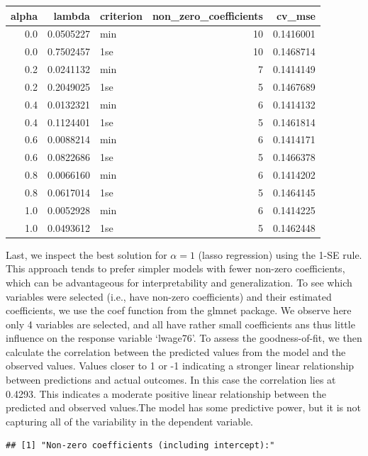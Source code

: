 \documentclass[
]{article}
\begin{document}
\begin{longtable}[]{@{}rrlrr@{}}
\toprule()
alpha & lambda & criterion & non\_zero\_coefficients & cv\_mse \\
\midrule()
\endhead
0.0 & 0.0505227 & min & 10 & 0.1416001 \\
0.0 & 0.7502457 & 1se & 10 & 0.1468714 \\
0.2 & 0.0241132 & min & 7 & 0.1414149 \\
0.2 & 0.2049025 & 1se & 5 & 0.1467689 \\
0.4 & 0.0132321 & min & 6 & 0.1414132 \\
0.4 & 0.1124401 & 1se & 5 & 0.1461814 \\
0.6 & 0.0088214 & min & 6 & 0.1414171 \\
0.6 & 0.0822686 & 1se & 5 & 0.1466378 \\
0.8 & 0.0066160 & min & 6 & 0.1414202 \\
0.8 & 0.0617014 & 1se & 5 & 0.1464145 \\
1.0 & 0.0052928 & min & 6 & 0.1414225 \\
1.0 & 0.0493612 & 1se & 5 & 0.1462448 \\
\bottomrule()
\end{longtable}

Last, we inspect the best solution for \(\alpha = 1\) (lasso regression)
using the 1-SE rule. This approach tends to prefer simpler models with
fewer non-zero coefficients, which can be advantageous for
interpretability and generalization. To see which variables were
selected (i.e., have non-zero coefficients) and their estimated
coefficients, we use the coef function from the glmnet package. We
observe here only 4 variables are selected, and all have rather small
coefficients ans thus little influence on the response variable
`lwage76'. To assess the goodness-of-fit, we then calculate the
correlation between the predicted values from the model and the observed
values. Values closer to 1 or -1 indicating a stronger linear
relationship between predictions and actual outcomes. In this case the
correlation lies at 0.4293. This indicates a moderate positive linear
relationship between the predicted and observed values.The model has
some predictive power, but it is not capturing all of the variability in
the dependent variable.

\begin{verbatim}
## [1] "Non-zero coefficients (including intercept):"
\end{verbatim}
\end{document}
